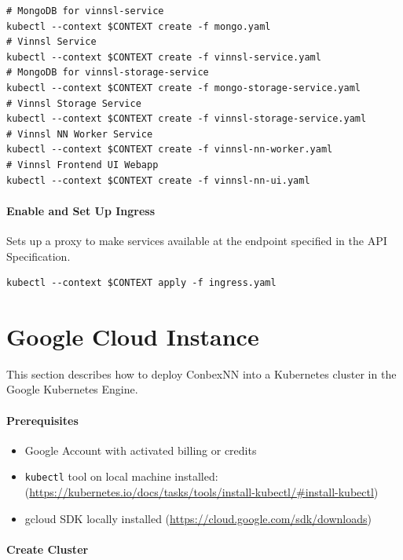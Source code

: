 \begin{verbatim}
# MongoDB for vinnsl-service
kubectl --context $CONTEXT create -f mongo.yaml 
# Vinnsl Service
kubectl --context $CONTEXT create -f vinnsl-service.yaml
# MongoDB for vinnsl-storage-service
kubectl --context $CONTEXT create -f mongo-storage-service.yaml
# Vinnsl Storage Service
kubectl --context $CONTEXT create -f vinnsl-storage-service.yaml
# Vinnsl NN Worker Service
kubectl --context $CONTEXT create -f vinnsl-nn-worker.yaml
# Vinnsl Frontend UI Webapp
kubectl --context $CONTEXT create -f vinnsl-nn-ui.yaml
\end{verbatim}

\paragraph{Enable and Set Up Ingress}\label{enable-and-set-up-ingress}

Sets up a proxy to make services available at the endpoint specified in
the API Specification.

\begin{verbatim}
kubectl --context $CONTEXT apply -f ingress.yaml
\end{verbatim}

\section{Google Cloud Instance}\label{google-cloud-instance}

This section describes how to deploy ConbexNN into a Kubernetes cluster
in the Google Kubernetes Engine.

\paragraph{Prerequisites}\label{prerequisites-1}

\begin{itemize}
\item
  Google Account with activated billing or credits
\item
  \texttt{kubectl} tool on local machine installed:
  (\url{https://kubernetes.io/docs/tasks/tools/install-kubectl/\#install-kubectl})
\item
  gcloud SDK locally installed
  (\url{https://cloud.google.com/sdk/downloads})
\end{itemize}

\paragraph{Create Cluster}\label{create-cluster}

